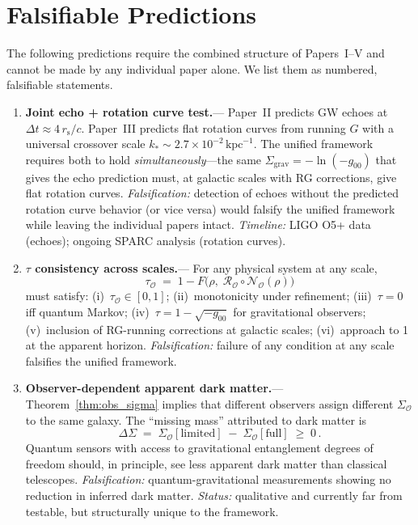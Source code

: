 \documentclass[prd,twocolumn,superscriptaddress,longbibliography,floatfix]{revtex4-2}
\newcommand{\Petz}{\mathcal{R}}
\newcommand{\chan}{\mathcal{N}}
\newcommand{\tauasym}{\tau}
\newcommand{\rs}{r_{\mathrm{s}}}
\newcommand{\Sgrav}{\Sigma_{\mathrm{grav}}}
\newcommand{\SigO}{\Sigma_{\mathcal{O}}}
\newcommand{\tauO}{\tauasym_{\mathcal{O}}}
\begin{document}
\section{Falsifiable Predictions}
\label{sec:predictions}

The following predictions require the combined structure
of Papers~I--V and cannot be made by any individual paper
alone.  We list them as numbered, falsifiable statements.

\begin{enumerate}

\item \textbf{Joint echo + rotation curve test.}---
Paper~II predicts GW echoes at
$\Delta t \approx 4\,\rs/c$.  Paper~III predicts flat
rotation curves from running $G$ with a universal
crossover scale $k_* \sim 2.7 \times 10^{-2}\,
\mathrm{kpc}^{-1}$.  The unified framework requires
both to hold \emph{simultaneously}---the same
$\Sgrav = -\ln(-g_{00})$ that gives the echo prediction
must, at galactic scales with RG corrections, give flat
rotation curves.  \emph{Falsification:} detection of
echoes without the predicted rotation curve behavior
(or vice versa) would falsify the unified framework
while leaving the individual papers intact.
\emph{Timeline:} LIGO O5+ data (echoes); ongoing
SPARC analysis (rotation curves).

\item \textbf{$\tauasym$ consistency across scales.}---
For any physical system at any scale,
\begin{equation}
\tauO \;=\; 1 - F\!\bigl(\rho,\;
\Petz_{\mathcal{O}}\!\circ\!\chan_{\mathcal{O}}(\rho)\bigr)
\label{eq:consistency}
\end{equation}
must satisfy: (i)~$\tauO \in [0,1]$;
(ii)~monotonicity under refinement;
(iii)~$\tauasym = 0$ iff quantum Markov;
(iv)~$\tauasym = 1 - \sqrt{-g_{00}}$ for gravitational
observers; (v)~inclusion of RG-running corrections at
galactic scales; (vi)~approach to 1 at the apparent
horizon.
\emph{Falsification:} failure of any condition at any
scale falsifies the unified framework.

\item \textbf{Observer-dependent apparent dark matter.}---
Theorem~\ref{thm:obs_sigma} implies that different
observers assign different $\SigO$ to the same galaxy.
The ``missing mass'' attributed to dark matter is
\begin{equation}
\Delta\Sigma \;=\; \SigO[{\mathrm{limited}}]
\;-\; \SigO[{\mathrm{full}}] \;\geq\; 0\,.
\label{eq:apparent_DM}
\end{equation}
Quantum sensors with access to gravitational entanglement
degrees of freedom should, in principle, see less apparent
dark matter than classical telescopes.
\emph{Falsification:} quantum-gravitational measurements
showing no reduction in inferred dark matter.
\emph{Status:} qualitative and currently far from
testable, but structurally unique to the framework.


\end{enumerate}
\end{document}
